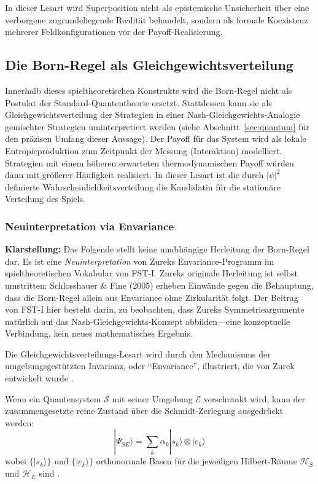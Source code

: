 \documentclass[12pt,a4paper]{article}
\theoremstyle{remark}
\begin{document}
In dieser Lesart wird Superposition nicht als epistemische Unsicherheit \"uber eine verborgene zugrundeliegende Realit\"at behandelt, sondern als formale Koexistenz mehrerer Feldkonfigurationen vor der Payoff-Realisierung.

\subsection{Die Born-Regel als Gleichgewichtsverteilung}

Innerhalb dieses spieltheoretischen Konstrukts wird die Born-Regel nicht als Postulat der Standard-Quantentheorie ersetzt. Stattdessen kann sie als Gleichgewichtsverteilung der Strategien in einer Nash-Gleichgewichts-Analogie gemischter Strategien uminterpretiert werden (siehe Abschnitt~\ref{sec:quantum} f\"ur den pr\"azisen Umfang dieser Aussage). Der Payoff f\"ur das System wird als lokale Entropieproduktion zum Zeitpunkt der Messung (Interaktion) modelliert. Strategien mit einem h\"oheren erwarteten thermodynamischen Payoff w\"urden dann mit gr\"o\ss{}erer H\"aufigkeit realisiert. In dieser Lesart ist die durch $|\psi|^2$ definierte Wahrscheinlichkeitsverteilung die Kandidatin f\"ur die station\"are Verteilung des Spiels.

\subsubsection{Neuinterpretation via Envariance}

\textbf{Klarstellung:} Das Folgende stellt keine unabh\"angige Herleitung der Born-Regel dar. Es ist eine \emph{Neuinterpretation} von Zureks Envariance-Programm \citep{Zurek2003,Zurek2005} im spieltheoretischen Vokabular von FST-I. Zureks originale Herleitung ist selbst umstritten: Schlosshauer \& Fine (2005) \citep{SchlossFine2005} erheben Einw\"ande gegen die Behauptung, dass die Born-Regel allein aus Envariance ohne Zirkularit\"at folgt. Der Beitrag von FST-I hier besteht darin, zu beobachten, dass Zureks Symmetrieargumente nat\"urlich auf das Nash-Gleichgewichts-Konzept abbilden---eine konzeptuelle Verbindung, kein neues mathematisches Ergebnis.

Die Gleichgewichtsverteilungs-Lesart wird durch den Mechanismus der umgebungsgest\"utzten Invarianz, oder ``Envariance'', illustriert, die von Zurek entwickelt wurde \citep{Zurek2003,Zurek2005}.

Wenn ein Quantensystem $\mathcal{S}$ mit seiner Umgebung $\mathcal{E}$ verschr\"ankt wird, kann der zusammengesetzte reine Zustand \"uber die Schmidt-Zerlegung ausgedr\"uckt werden:
\begin{equation}
|\Psi_{SE}\rangle = \sum_k \alpha_k |s_k\rangle \otimes |e_k\rangle
\end{equation}
wobei $\{|s_k\rangle\}$ und $\{|e_k\rangle\}$ orthonormale Basen f\"ur die jeweiligen Hilbert-R\"aume $\mathcal{H}_S$ und $\mathcal{H}_E$ sind \citep{SchlossFine2005}.
\end{document}
